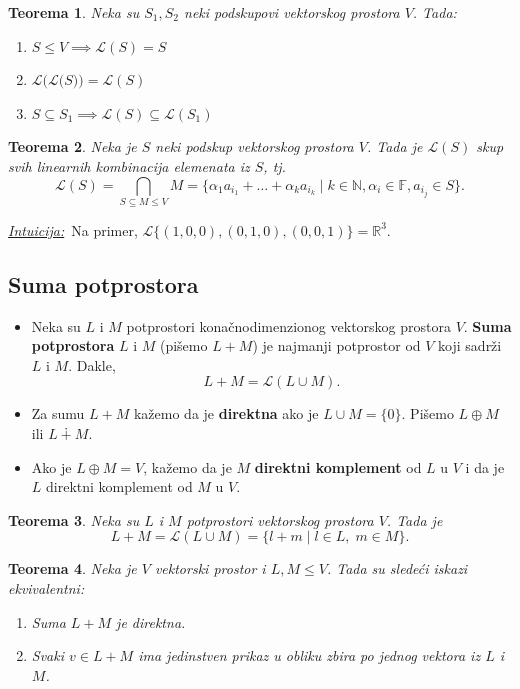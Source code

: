 \documentclass[a4paper,12pt,twoside]{report}
\newtheorem{theorem}{Teorema}[section]
\numberwithin{algorithm}{section}
\newcommand{\intuicija}{\noindent\underline{\textit{Intuicija:}}\ }
\begin{document}
\begin{theorem}
    Neka su $S_1, S_2$ neki podskupovi vektorskog prostora $V$. Tada:
    \begin{enumerate}
        \item $S\leq V \implies \mathcal{L}(S) = S$
        \item $\mathcal{L(L(}S)) = \mathcal{L}(S)$
        \item $S\subseteq S_1 \implies \mathcal{L}(S) \subseteq \mathcal{L}(S_1)$
    \end{enumerate}
\end{theorem}

\begin{theorem}
    Neka je $S$ neki podskup vektorskog prostora $V$. Tada je $\mathcal{L}(S)$ skup svih linearnih kombinacija elemenata iz $S$, tj.
    \[ \mathcal{L}(S) = \bigcap_{S \subseteq M \leq V} M = \{\alpha_1a_{i_1} + \dots + \alpha_ka_{i_k}\;|\;k \in \mathbb{N}, \alpha_i \in \mathbb{F}, a_{i_j}\in S\}. \]
\end{theorem}

\intuicija Na primer, $\mathcal{L}\{(1, 0, 0), (0, 1, 0), (0, 0, 1)\} = \mathbb{R}^3$.
\vfill
\subsection{Suma potprostora}
\begin{itemize}
    \item Neka su $L$ i $M$ potprostori konačnodimenzionog vektorskog prostora $V$. \textbf{Suma potprostora} $L$ i $M$ 
    (pišemo $L + M$) je najmanji potprostor od $V$ koji sadrži \linebreak $L$ i $M$. Dakle, \[ L + M = \mathcal{L}(L \cup M). \]
    \item Za sumu $L + M$ kažemo da je \textbf{direktna} ako je $L \cup M = \{0\}$. Pišemo $L \oplus M$ ili $L \dotplus M$.
    \item Ako je $L \oplus M = V$, kažemo da je $M$ \textbf{direktni komplement} od $L$ u $V$ i da je $L$ direktni komplement
    od $M$ u $V$.
\end{itemize}

\begin{theorem}
    Neka su $L$ i $M$ potprostori vektorskog prostora $V$. Tada je
    \[ L + M = \mathcal{L}(L \cup M) = \{ l + m \;|\; l \in L, \; m \in M \}. \]
\end{theorem}

\begin{theorem}
    Neka je $V$ vektorski prostor i $L, M \leq V$. Tada su sledeći iskazi ekvivalentni:
    \begin{enumerate}
        \item Suma $L + M$ je direktna.
        \item Svaki $v \in L + M$ ima jedinstven prikaz u obliku zbira po jednog vektora iz $L$ i $M$.
    \end{enumerate}
\end{theorem}
\end{document}
